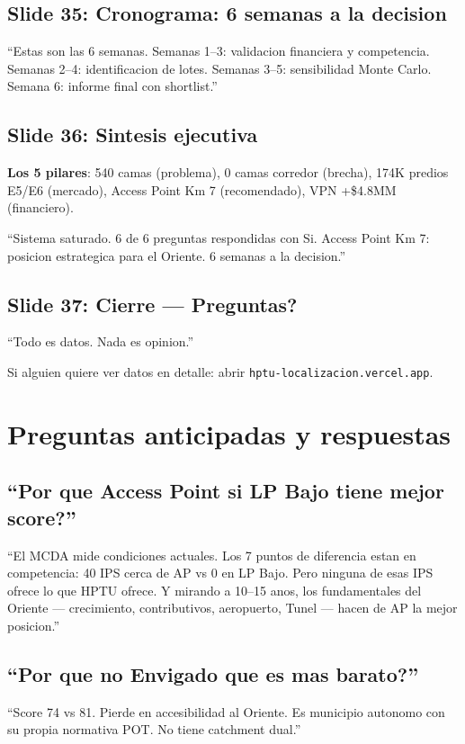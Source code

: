 \documentclass[10pt, a4paper]{article}
\newcommand{\slide}[2]{\subsection{Slide #1: #2}}
\begin{document}
\slide{35}{Cronograma: 6 semanas a la decision}
\begin{tip}
``Estas son las 6 semanas. Semanas 1--3: validacion financiera y competencia. Semanas 2--4: identificacion de lotes. Semanas 3--5: sensibilidad Monte Carlo. Semana 6: informe final con shortlist.''
\end{tip}

\slide{36}{Sintesis ejecutiva}
\textbf{Los 5 pilares}: 540 camas (problema), 0 camas corredor (brecha), 174K predios E5/E6 (mercado), Access Point Km 7 (recomendado), VPN +\$4.8MM (financiero).

\begin{cita}
``Sistema saturado. 6 de 6 preguntas respondidas con Si. Access Point Km 7: posicion estrategica para el Oriente. 6 semanas a la decision.''
\end{cita}

\slide{37}{Cierre --- Preguntas?}
\begin{tip}
``Todo es datos. Nada es opinion.''

\vspace{4pt}
Si alguien quiere ver datos en detalle: abrir \texttt{hptu-localizacion.vercel.app}.
\end{tip}

\section{Preguntas anticipadas y respuestas}

\subsection{``Por que Access Point si LP Bajo tiene mejor score?''}
\begin{tip}
``El MCDA mide condiciones actuales. Los 7 puntos de diferencia estan en competencia: 40 IPS cerca de AP vs 0 en LP Bajo. Pero ninguna de esas IPS ofrece lo que HPTU ofrece. Y mirando a 10--15 anos, los fundamentales del Oriente --- crecimiento, contributivos, aeropuerto, Tunel --- hacen de AP la mejor posicion.''
\end{tip}

\subsection{``Por que no Envigado que es mas barato?''}
\begin{tip}
``Score 74 vs 81. Pierde en accesibilidad al Oriente. Es municipio autonomo con su propia normativa POT. No tiene catchment dual.''
\end{tip}
\end{document}
